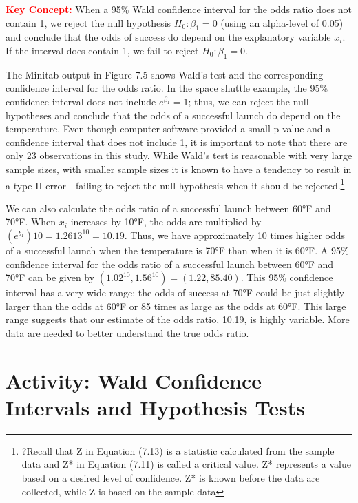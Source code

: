 \documentclass[
]{report}
\begin{document}
\Large

\textbf{\textcolor{red}{Key Concept:}}
\color{red}
When a 95\% Wald confidence interval for the odds ratio does not contain 1, we reject the null hypothesis \(H_0: \beta_1 = 0\) (using an alpha-level of 0.05) and conclude that the odds of success do depend on the explanatory variable \(x_i\). If the interval does contain 1, we fail to reject \(H_0: \beta_1 = 0\).
\color{black}
\normalsize

The Minitab output in Figure 7.5 shows Wald's test and the corresponding confidence interval for the
odds ratio. In the space shuttle example, the 95\% confidence interval does not include \(e^{\beta_1} = 1\); thus, we can
reject the null hypotheses and conclude that the odds of a successful launch do depend on the temperature.
Even though computer software provided a small p-value and a confidence interval that does not include 1, it
is important to note that there are only 23 observations in this study. While Wald's test is reasonable with very
large sample sizes, with smaller sample sizes it is known to have a tendency to result in a type II error---failing
to reject the null hypothesis when it should be rejected.\footnote{?Recall that Z in Equation (7.13) is a statistic calculated from the sample data and Z* in Equation (7.11) is called a critical value. Z* represents a value based on a desired level of confidence. Z* is known before the data are collected, while Z is based on the sample data}

We can also calculate the odds ratio of a successful launch between 60°F and 70°F. When \(x_i\)
increases by 10°F, the odds are multiplied by \((e^{b_1})10 = 1.2613^{10} = 10.19\). Thus, we have approximately
10 times higher odds of a successful launch when the temperature is 70°F than when it is 60°F. A 95\%
confidence interval for the odds ratio of a successful launch between 60°F and 70°F can be given by
\((1.02^10, 1.56^10) = (1.22, 85.40)\). This 95\% confidence interval has a very wide range; the odds of success
at 70°F could be just slightly larger than the odds at 60°F or 85 times as large as the odds at 60°F. This
large range suggests that our estimate of the odds ratio, 10.19, is highly variable. More data are needed to
better understand the true odds ratio.

\section*{Activity: Wald Confidence Intervals and Hypothesis Tests}\label{activity-wald-confidence-intervals-and-hypothesis-tests}
\end{document}
